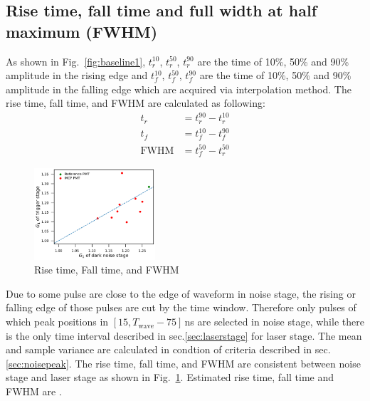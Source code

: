 \subsection{Rise time, fall time and full width at half maximum (FWHM)}
As shown in Fig.~\ref{fig:baseline1}, $t^{10}_r$, $t^{50}_r$, $t^{90}_r$ are the time of 10\%, 50\% and 90\% amplitude in the rising edge and $t^{10}_f$, $t^{50}_f$, $t^{90}_f$ are the time of 10\%, 50\% and 90\% amplitude in the falling edge which are acquired via interpolation method. The rise time, fall time, and FWHM are calculated as following:
\begin{align}
    t_r &= t^{90}_r - t^{10}_r\\
    t_f &= t^{10}_f - t^{90}_f\\
    \mathrm{FWHM} &= t^{50}_f - t^{50}_r
\end{align}
\begin{figure}[!htbp]
    \includegraphics[width=0.4\textwidth,page=7]{figures/result/compare.pdf}
    \caption{Rise time, Fall time, and FWHM}
    \label{fig:RiseCompare}
\end{figure}
Due to some pulse are close to the edge of waveform in noise stage, the rising or falling edge of those pulses are cut by the time window. Therefore only pulses of which peak positions in $[15, T_{\mathrm{wave}}-75]$\,ns are selected in noise stage, while there is the only time interval described in sec.\ref{sec:laserstage} for laser stage.
The mean and sample variance are calculated in condtion of criteria described in sec.\ref{sec:noisepeak}. The rise time, fall time, and FWHM are consistent between noise stage and laser stage as shown in Fig.~\ref{fig:RiseCompare}. Estimated rise time, fall time and FWHM are .

